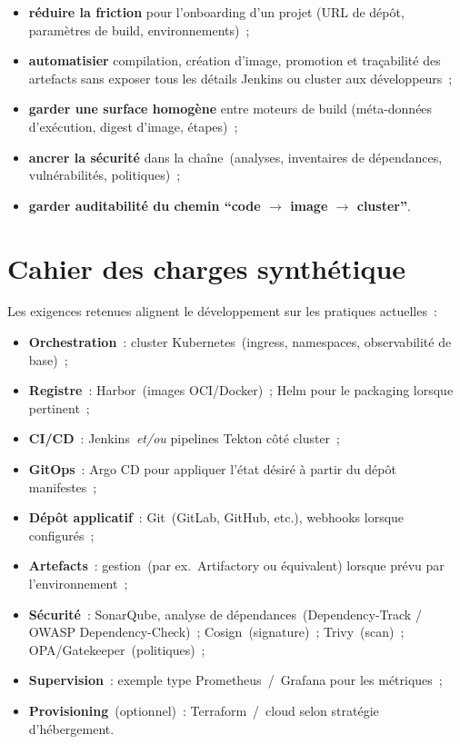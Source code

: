 \begin{itemize}[leftmargin=*]
\item \textbf{réduire la friction} pour l'onboarding d'un projet (URL de dépôt, paramètres de build, environnements)~;
\item \textbf{automatisier} compilation, création d'image, promotion et traçabilité des artefacts sans exposer tous les détails Jenkins ou cluster aux développeurs~;
\item \textbf{garder une surface homogène} entre moteurs de build (méta-données d'exécution, digest d'image, étapes)~;
\item \textbf{ancrer la sécurité} dans la chaîne~(analyses, inventaires de dépendances, vulnérabilités, politiques)~;
\item \textbf{garder auditabilité du chemin ``code $\rightarrow$ image $\rightarrow$ cluster''}.
\end{itemize}

\section{Cahier des charges synthétique}

Les exigences retenues alignent le développement sur les pratiques actuelles~:

\begin{itemize}[leftmargin=*]
\item \textbf{Orchestration}~: cluster Kubernetes~(ingress, namespaces, observabilité de base)~;
\item \textbf{Registre}~: Harbor~(images OCI/Docker)~; Helm pour le packaging lorsque pertinent~;
\item \textbf{CI/CD}~: Jenkins~\emph{et/ou} pipelines Tekton côté cluster~;
\item \textbf{GitOps}~: Argo CD pour appliquer l'état désiré à partir du dépôt manifestes~;
\item \textbf{Dépôt applicatif}~: Git~(GitLab, GitHub, etc.), webhooks lorsque configurés~;
\item \textbf{Artefacts}~: gestion~(par ex.\ Artifactory ou équivalent) lorsque prévu par l'environnement~;
\item \textbf{Sécurité}~: SonarQube, analyse de dépendances~(Dependency-Track / OWASP Dependency-Check)~; Cosign~(signature)~; Trivy~(scan)~; OPA/Gatekeeper~(politiques)~;
\item \textbf{Supervision}~: exemple type Prometheus~/~Grafana pour les métriques~;
\item \textbf{Provisioning}~(optionnel)~: Terraform~/~cloud selon stratégie d'hébergement.
\end{itemize}

